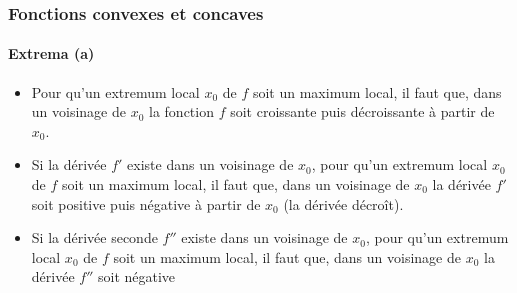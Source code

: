 \documentclass[10pt,notheorems]{beamer}
\theoremstyle{plain}
\theoremstyle{definition} %
\begin{document}
\begin{frame}
  \frametitle{Fonctions convexes et concaves}
  \framesubtitle{Extrema (a)}
  \hypertarget{slide_fonctions_convexes_8}{}

  \begin{itemize}

  \item Pour qu'un extremum local $x_0$ de $f$ soit un maximum local,
    il faut que, dans un voisinage de $x_0$ la fonction $f$ soit
    croissante puis décroissante à partir de $x_0$.\newline

  \item Si la dérivée $f'$ existe dans un voisinage de $x_0$, pour
    qu'un extremum local $x_0$ de $f$ soit un maximum local, il faut
    que, dans un voisinage de $x_0$ la dérivée $f'$ soit positive
    puis négative à partir de $x_0$ (la dérivée décroît).\newline

  \item Si la dérivée seconde $f''$ existe dans un voisinage de $x_0$, pour
    qu'un extremum local $x_0$ de $f$ soit un maximum local, il faut
    que, dans un voisinage de $x_0$ la dérivée $f''$ soit négative\newline

  \end{itemize}

\end{frame}
\end{document}
